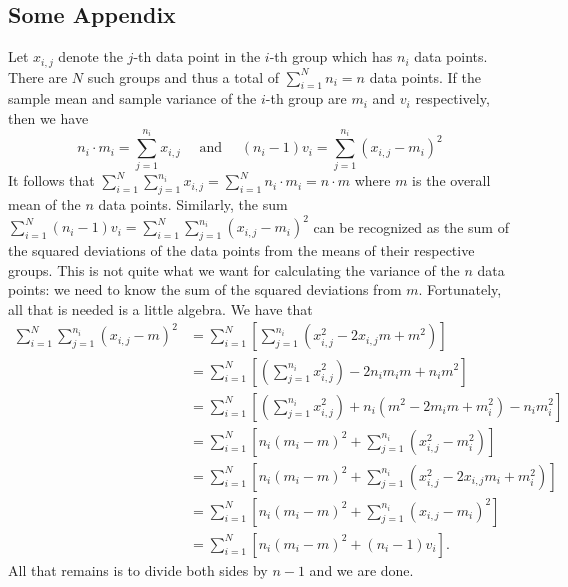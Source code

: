 \documentclass[../Thesis-IJspeert.tex]{subfiles}
\begin{document}
\begin{appendices}
\chapter{Some Appendix}
Let $x_{i, j}$ denote the $j$-th data point in the $i$-th group which has $n_{i}$ data points. There are $N$ such groups and thus a total of $\sum_{i=1}^{N} n_{i}=n$ data points. If the sample mean and sample variance of the $i$-th group are $m_{i}$ and $v_{i}$ respectively, then we have
\begin{equation}
n_{i} \cdot m_{i}=\sum_{j=1}^{n_{i}} x_{i, j} \quad \text { and } \quad\left(n_{i}-1\right) v_{i}=\sum_{j=1}^{n_{i}}\left(x_{i, j}-m_{i}\right)^{2}
\end{equation}
It follows that $\sum_{i=1}^{N} \sum_{j=1}^{n_{i}} x_{i, j}=\sum_{i=1}^{N} n_{i} \cdot m_{i}=n \cdot m$ where $m$ is the overall mean of the $n$ data points. Similarly, the sum $\sum_{i=1}^{N}\left(n_{i}-1\right) v_{i}=\sum_{i=1}^{N} \sum_{j=1}^{n_{i}}\left(x_{i, j}-m_{i}\right)^{2}$ can be recognized as the sum of the squared deviations of the data points from the means of their respective groups. This is not quite what we want for calculating the variance of the $n$ data points: we need to know the sum of the squared deviations from $m$. Fortunately, all that is needed is a little algebra. We have that
\begin{equation}
\begin{aligned}
	\sum_{i=1}^{N} \sum_{j=1}^{n_{i}}\left(x_{i, j}-m\right)^{2} & =\sum_{i=1}^{N}\left[\sum_{j=1}^{n_{i}}\left(x_{i, j}^{2}-2 x_{i, j} m+m^{2}\right)\right] \\
	& =\sum_{i=1}^{N}\left[\left(\sum_{j=1}^{n_{i}} x_{i, j}^{2}\right)-2 n_{i} m_{i} m+n_{i} m^{2}\right] \\
	& =\sum_{i=1}^{N}\left[\left(\sum_{j=1}^{n_{i}} x_{i, j}^{2}\right)+n_{i}\left(m^{2}-2 m_{i} m+m_{i}^{2}\right)-n_{i} m_{i}^{2}\right] \\
	& =\sum_{i=1}^{N}\left[n_{i}\left(m_{i}-m\right)^{2}+\sum_{j=1}^{n_{i}}\left(x_{i, j}^{2}-m_{i}^{2}\right)\right] \\
	& =\sum_{i=1}^{N}\left[n_{i}\left(m_{i}-m\right)^{2}+\sum_{j=1}^{n_{i}}\left(x_{i, j}^{2}-2 x_{i, j} m_{i}+m_{i}^{2}\right)\right] \\
	& =\sum_{i=1}^{N}\left[n_{i}\left(m_{i}-m\right)^{2}+\sum_{j=1}^{n_{i}}\left(x_{i, j}-m_{i}\right)^{2}\right] \\
	& =\sum_{i=1}^{N}\left[n_{i}\left(m_{i}-m\right)^{2}+\left(n_{i}-1\right) v_{i}\right] .
\end{aligned}
\end{equation}
All that remains is to divide both sides by $n-1$ and we are done.


\end{appendices}
\end{document}
